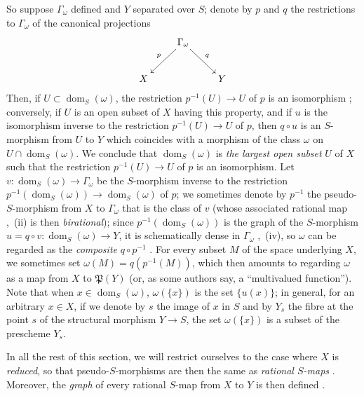 \begin{env}[20.4.2]
\label{IV.20.4.2}
So suppose $\Gamma_\omega$ defined and $Y$ separated over $S$; denote by $p$ and $q$ the restrictions to $\Gamma_\omega$ of the canonical projections
\[
  \xymatrix{
  & \Gamma_\omega \ar[dl]_p \ar[dr]^q & \\
  X & & Y
  }
\]
Then, if $U\subset\operatorname{dom}_S(\omega)$, the restriction $p^{-1}(U)\to U$ of $p$ is an isomorphism ; conversely, if $U$ is an open subset of $X$ having this property, and if $u$ is the isomorphism inverse to the restriction $p^{-1}(U)\to U$ of $p$, then $q\circ u$ is an $S$-morphism from $U$ to $Y$ which coincides with a morphism of the class $\omega$ on $U\cap\operatorname{dom}_S(\omega)$.
We conclude that $\operatorname{dom}_S(\omega)$ is \emph{the largest open subset} $U$ of $X$ such that the restriction $p^{-1}(U)\to U$ of $p$ is an
isomorphism.
Let $v:\operatorname{dom}_S(\omega)\to\Gamma_\omega$ be the $S$-morphism inverse to the restriction $p^{-1}(\operatorname{dom}_S(\omega))\to\operatorname{dom}_S(\omega)$ of $p$; we sometimes denote by $p^{-1}$ the pseudo-$S$-morphism from $X$ to $\Gamma_\omega$ that is the class of $v$ (whose associated rational map ,~(ii) is then \emph{birational}); since $p^{-1}(\operatorname{dom}_S(\omega))$ is the graph of the $S$-morphism $u=q\circ v:\operatorname{dom}_S(\omega)\to Y$, it is schematically dense in $\Gamma_\omega$ ,~(iv), so $\omega$ can be regarded as the \emph{composite} $q\circ p^{-1}$ .
For every subset $M$ of the space underlying $X$, we sometimes set $\omega(M)=q(p^{-1}(M))$, which then amounts to regarding $\omega$ as a map from $X$ to $\mathfrak{P}(Y)$ (or, as some authors say, a ``multivalued function'').
Note that when $x\in\operatorname{dom}_S(\omega)$, $\omega(\{x\})$ is the set $\{u(x)\}$; in general, for an arbitrary $x\in X$, if we denote by $s$ the image of $x$ in $S$ and by $Y_s$ the fibre at the point $s$ of the structural morphism $Y\to S$, the set $\omega(\{x\})$ is a subset of the prescheme $Y_s$.
\end{env}

\begin{env}[20.4.3]
\label{IV.20.4.3}
In all the rest of this section, we will restrict ourselves to the case where $X$ is \emph{reduced}, so that pseudo-$S$-morphisms are then the same as \emph{rational $S$-maps} .
Moreover, the \emph{graph} of every rational $S$-map from $X$ to $Y$ is then defined .
\end{env}


